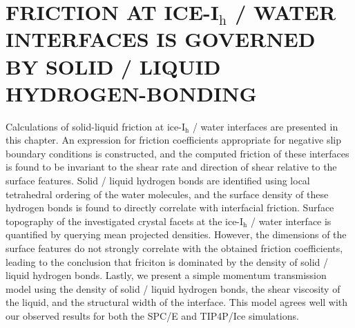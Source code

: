 \chapter{FRICTION AT ICE-I$_\mathrm{h}$ / WATER INTERFACES IS GOVERNED
  BY SOLID / LIQUID HYDROGEN-BONDING}\label{chap:Friction}

Calculations of solid-liquid friction at ice-I$_\mathrm{h}$ / water
interfaces are presented in this chapter.  An expression for friction
coefficients appropriate for negative slip boundary conditions is
constructed, and the computed friction of these interfaces is found to
be invariant to the shear rate and direction of shear relative to the
surface features. Solid / liquid hydrogen bonds are identified using
local tetrahedral ordering of the water molecules, and the surface
density of these hydrogen bonds is found to directly correlate with
interfacial friction. Surface topography of the investigated crystal
facets at the ice-I$_\mathrm{h}$ / water interface is quantified by
querying mean projected densities. However, the dimensions of the
surface features do not strongly correlate with the obtained friction
coefficients, leading to the conclusion that friciton is dominated by
the density of solid / liquid hydrogen bonds.  Lastly, we present a
simple momentum transmission model using the density of solid / liquid
hydrogen bonds, the shear viscosity of the liquid, and the structural
width of the interface. This model agrees well with our observed
results for both the SPC/E and TIP4P/Ice simulations.




